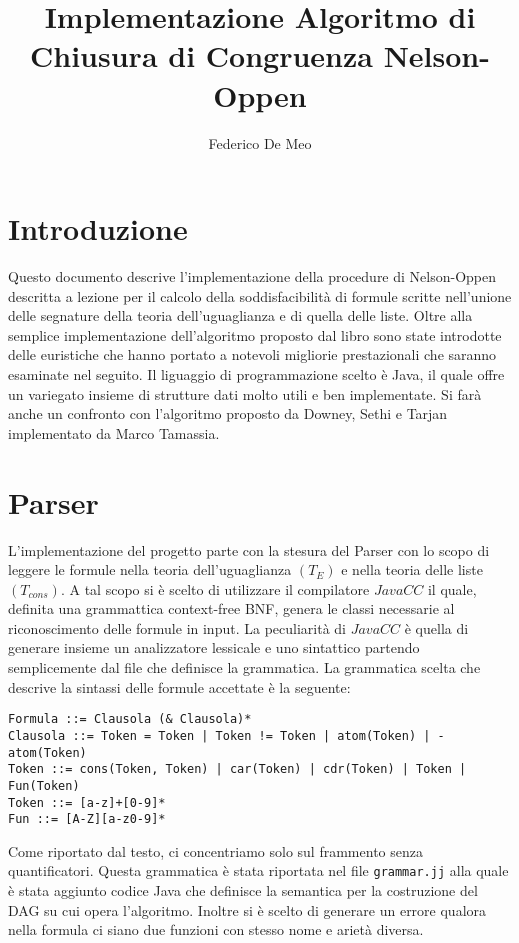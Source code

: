\documentclass[a4paper,11pt]{article}
\title{Implementazione Algoritmo di Chiusura di Congruenza Nelson-Oppen}
\author{Federico De Meo}
\begin{document}
\maketitle

\footnotesize
\section*{Introduzione}
Questo documento descrive l'implementazione della procedure di Nelson-Oppen descritta a lezione per il calcolo della soddisfacibilità di formule scritte nell'unione delle segnature della teoria dell'uguaglianza e di quella delle liste. Oltre alla semplice implementazione dell'algoritmo proposto dal libro sono state introdotte delle euristiche che hanno portato a notevoli migliorie prestazionali che saranno esaminate nel seguito.
Il liguaggio di programmazione scelto è Java, il quale offre un variegato insieme di strutture dati molto utili e ben implementate.
Si farà anche un confronto con l'algoritmo proposto da Downey, Sethi e Tarjan implementato da Marco Tamassia.

\section{Parser}
L'implementazione del progetto parte con la stesura del Parser con lo scopo di leggere le formule nella teoria dell'uguaglianza $(T_E)$ e nella teoria delle liste $(T_{cons})$.
A tal scopo si è scelto di utilizzare il compilatore $JavaCC$ il quale, definita una grammattica context-free BNF, genera le classi necessarie al riconoscimento delle formule in input.
La peculiarità di $JavaCC$ è quella di generare insieme un analizzatore lessicale e uno sintattico partendo semplicemente dal file che definisce la grammatica.
La grammatica scelta che descrive la sintassi delle formule accettate è la seguente:
\begin{lstlisting}
Formula ::= Clausola (& Clausola)*
Clausola ::= Token = Token | Token != Token | atom(Token) | -atom(Token)
Token ::= cons(Token, Token) | car(Token) | cdr(Token) | Token | Fun(Token)
Token ::= [a-z]+[0-9]*
Fun ::= [A-Z][a-z0-9]*
\end{lstlisting}
Come riportato dal testo, ci concentriamo solo sul frammento senza quantificatori.
Questa grammatica è stata riportata nel file {\tt grammar.jj} alla quale è stata aggiunto codice Java che definisce la semantica per la costruzione del DAG su cui opera l'algoritmo.
Inoltre si è scelto di generare un errore qualora nella formula ci siano due funzioni con stesso nome e arietà diversa.
\end{document}
